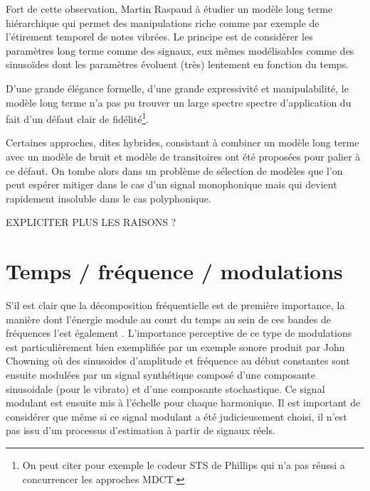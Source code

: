 Fort de cette observation, Martin Raspaud à étudier un modèle long terme hiérarchique qui permet des manipulations riche comme par exemple de l'étirement temporel de notes vibrées. Le principe est de considérer les paramètres long terme comme des signaux, eux mêmes modélisables comme des sinusoïdes dont les paramètres évoluent (très) lentement en fonction du temps.

D'une grande élégance formelle, d'une grande expressivité et manipulabilité, le modèle long terme n'a pas pu trouver un large spectre spectre d'application du fait d'un défaut clair de fidélité\footnote{On peut citer pour exemple le codeur STS de Phillips qui n'a pas réussi a concurrencer les approches MDCT.}.

Certaines approches, dites hybrides, consistant à combiner un modèle long terme avec un modèle de bruit et modèle de transitoires ont été proposées pour palier à ce défaut. On tombe alors dans un problème de sélection de modèles que l'on peut espérer mitiger dans le cas d'un signal monophonique mais qui devient  rapidement insoluble dans le cas polyphonique.

EXPLICITER PLUS LES RAISONS ?

\section{ \nmu Temps / fréquence / modulations}  \label{sec:tfm}

S'il est clair que la décomposition fréquentielle est de première importance, la manière dont l'énergie module au court du temps au sein de ces bandes de fréquences l'est également . L'importance perceptive de ce type de modulations est particulièrement bien exemplifiée par un exemple sonore produit par John Chowning où des sinusoides d'amplitude et fréquence au début constantes sont ensuite modulées par un signal synthétique composé d'une composante sinusoidale (pour le vibrato) et d'une composante stochastique. Ce signal modulant est ensuite mis à l'échelle pour chaque harmonique. Il est important de considérer que même si ce signal modulant a été judicieusement choisi, il n'est pas issu d'un processus d'estimation à partir de signaux réels.

